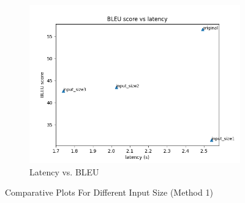 \documentclass[11pt]{article}
\begin{document}
\begin{figure}[h]
\begin{subfigure}{0.32\textwidth}
        \includegraphics[width=\textwidth]{images/input_size/BLEU_vs_latency.png}
        \caption{Latency vs. BLEU }
    \end{subfigure}
    \caption{\label{fig:input_size}Comparative Plots For Different Input Size (Method 1)}
\end{figure}
\end{document}
